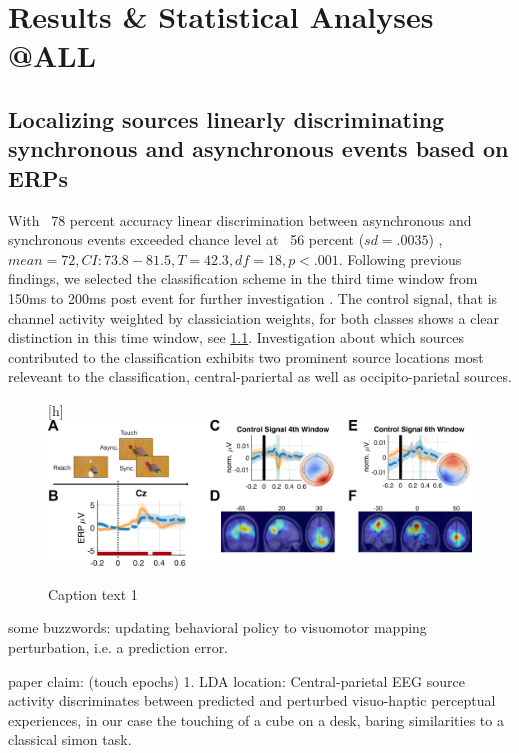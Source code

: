 \section{Results \& Statistical Analyses @ALL}
\subsection{Localizing sources linearly discriminating synchronous and asynchronous events based on ERPs}

With ~78 percent accuracy linear discrimination between asynchronous and synchronous events exceeded chance level at ~56 percent ($sd = .0035$) , $mean = 72, CI: 73.8 - 81.5  , T = 42.3, df = 18, p < .001$. Following previous findings, we selected the classification scheme in the third time window from 150ms to 200ms post event for further investigation \cite{Gehrke2019}. The control signal, that is channel activity weighted by classiciation weights, for both classes shows a clear distinction in this time window, see \ref{}. Investigation about which sources contributed to the classification exhibits two prominent source locations most releveant to the classification, central-pariertal as well as occipito-parietal sources. 


\begin{figure}{\textwidth}[h]
    \centering\includegraphics[width=\textwidth]{figures/fig1_lda/fig1_lda.pdf}
    \label{lda}
    \caption{Caption text 1}
\end{figure}

some buzzwords:
updating behavioral policy to 
visuomotor mapping
perturbation, i.e. a prediction error.

paper claim:
(touch epochs)
1. LDA location: Central-parietal EEG source activity discriminates between predicted and perturbed visuo-haptic perceptual experiences, in our case the touching of a cube on a desk, baring similarities to a classical simon task.

